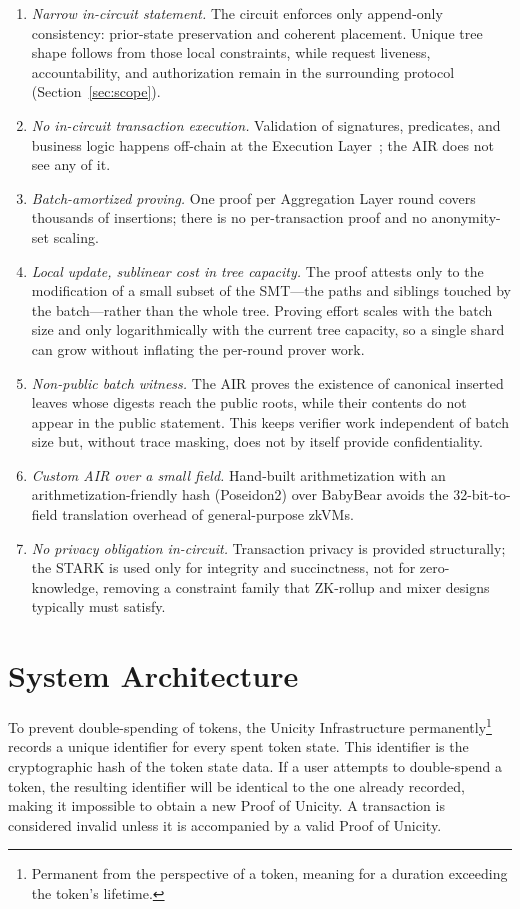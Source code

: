 \documentclass[twocolumn]{article}
\begin{document}
\begin{enumerate}[nosep]
    \item \emph{Narrow in-circuit statement.} The circuit enforces only append-only consistency: prior-state preservation and coherent placement. Unique tree shape follows from those local constraints, while request liveness, accountability, and authorization remain in the surrounding protocol (Section~\ref{sec:scope}).
    \item \emph{No in-circuit transaction execution.} Validation of signatures, predicates, and business logic happens off-chain at the Execution Layer~\cite{exemodel}; the AIR does not see any of it.
    \item \emph{Batch-amortized proving.} One proof per Aggregation Layer round covers thousands of insertions; there is no per-transaction proof and no anonymity-set scaling.
    \item \emph{Local update, sublinear cost in tree capacity.} The proof attests only to the modification of a small subset of the SMT---the paths and siblings touched by the batch---rather than the whole tree. Proving effort scales with the batch size and only logarithmically with the current tree capacity, so a single shard can grow without inflating the per-round prover work.
    \item \emph{Non-public batch witness.} The AIR proves the existence of canonical inserted leaves whose digests reach the public roots, while their contents do not appear in the public statement. This keeps verifier work independent of batch size but, without trace masking, does not by itself provide confidentiality.
    \item \emph{Custom AIR over a small field.} Hand-built arithmetization with an arithmetization-friendly hash (Poseidon2) over BabyBear avoids the 32-bit-to-field translation overhead of general-purpose zkVMs.
    \item \emph{No privacy obligation in-circuit.} Transaction privacy is provided structurally; the STARK is used only for integrity and succinctness, not for zero-knowledge, removing a constraint family that ZK-rollup and mixer designs typically must satisfy.
\end{enumerate}


\section{System Architecture}

To prevent double-spending of tokens, the Unicity Infrastructure permanently\footnote{Permanent from the perspective of a token, meaning for a duration exceeding the token's lifetime.} records a unique identifier for every spent token state. This identifier is the cryptographic hash of the token state data. If a user attempts to double-spend a token, the resulting identifier will be identical to the one already recorded, making it impossible to obtain a new Proof of Unicity. A transaction is considered invalid unless it is accompanied by a valid Proof of Unicity.
\end{document}
